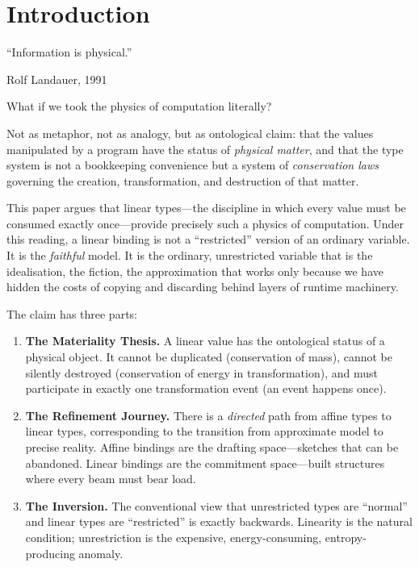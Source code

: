\documentclass[11pt,a4paper]{article}
\begin{document}
\newpage
\tableofcontents
\newpage

\section{Introduction}
\label{sec:intro}

\epigraph{%
  ``Information is physical.''
}{Rolf Landauer, 1991}

\noindent
What if we took the physics of computation literally?

Not as metaphor, not as analogy, but as ontological claim: that the
values manipulated by a program have the status of \emph{physical
matter}, and that the type system is not a bookkeeping convenience but
a system of \emph{conservation laws} governing the creation,
transformation, and destruction of that matter.

This paper argues that linear types---the discipline in which every
value must be consumed exactly once---provide precisely such a
physics of computation. Under this reading, a linear binding is not a
``restricted'' version of an ordinary variable. It is the \emph{faithful}
model. It is the ordinary, unrestricted variable that is the
idealisation, the fiction, the approximation that works only because
we have hidden the costs of copying and discarding behind layers of
runtime machinery.

The claim has three parts:

\begin{enumerate}[label=(\roman*)]
\item \textbf{The Materiality Thesis.} A linear value has the
  ontological status of a physical object. It cannot be duplicated
  (conservation of mass), cannot be silently destroyed (conservation
  of energy in transformation), and must participate in exactly one
  transformation event (an event happens once).

\item \textbf{The Refinement Journey.} There is a \emph{directed}
  path from affine types to linear types, corresponding to the
  transition from approximate model to precise reality. Affine
  bindings are the drafting space---sketches that can be abandoned.
  Linear bindings are the commitment space---built structures where
  every beam must bear load.

\item \textbf{The Inversion.} The conventional view that unrestricted
  types are ``normal'' and linear types are ``restricted'' is exactly
  backwards. Linearity is the natural condition; unrestriction is the
  expensive, energy-consuming, entropy-producing anomaly.
\end{enumerate}
\end{document}

